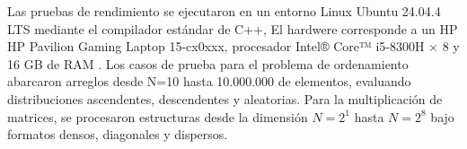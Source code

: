 Las pruebas de rendimiento se ejecutaron en un entorno Linux Ubuntu  24.04.4 LTS mediante el compilador estándar de C++, El hardwere corresponde a un HP HP Pavilion Gaming Laptop 15-cx0xxx, procesador Intel® Core™ i5-8300H × 8 y 16 GB de RAM  . Los casos de prueba para el problema de ordenamiento abarcaron arreglos desde N=10 hasta 10.000.000 de elementos, evaluando distribuciones ascendentes, descendentes y aleatorias. Para la multiplicación de matrices, se procesaron estructuras desde la dimensión $N=2^1$
  hasta $N=2^8$ bajo formatos densos, diagonales y dispersos.
